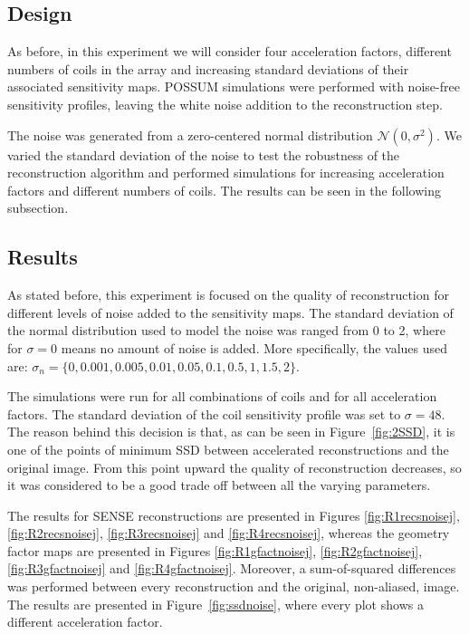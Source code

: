 \subsection{Design}
As before, in this experiment we will consider four acceleration factors, different numbers of coils in the array and increasing standard deviations of their associated sensitivity maps. POSSUM simulations were performed with noise-free sensitivity profiles, leaving the white noise addition to the reconstruction step.

The noise was generated from a zero-centered normal distribution $\mathcal{N}(0, \sigma^2)$. We varied the standard deviation of the noise to test the robustness of the reconstruction algorithm and performed simulations for increasing acceleration factors and different numbers of coils. The results can be seen in the following subsection.

\subsection{Results}
As stated before, this experiment is focused on the quality of reconstruction for different levels of noise added to the sensitivity maps. The standard deviation of the normal distribution used to model the noise was ranged from 0 to 2, where for $\sigma = 0$ means no amount of noise is added. More specifically, the values used are: $\sigma_n = \{ 0, 0.001, 0.005, 0.01, 0.05, 0.1, 0.5, 1, 1.5, 2\}$.

The simulations were run for all combinations of coils and for all acceleration factors. The standard deviation of the coil sensitivity profile was set to $\sigma = 48$. The reason behind this decision is that, as can be seen in Figure~\ref{fig:2SSD}, it is one of the points of minimum SSD between accelerated reconstructions and the original image. From this point upward the quality of reconstruction decreases, so it was considered to be a good trade off between all the varying parameters.

The results for SENSE reconstructions are presented in Figures \ref{fig:R1recsnoisej}, \ref{fig:R2recsnoisej}, \ref{fig:R3recsnoisej} and \ref{fig:R4recsnoisej}, whereas the geometry factor maps are presented in Figures \ref{fig:R1gfactnoisej}, \ref{fig:R2gfactnoisej}, \ref{fig:R3gfactnoisej} and \ref{fig:R4gfactnoisej}. Moreover, a sum-of-squared differences was performed between every reconstruction and the original, non-aliased, image. The results are presented in Figure~\ref{fig:ssdnoise}, where every plot shows a different acceleration factor.

